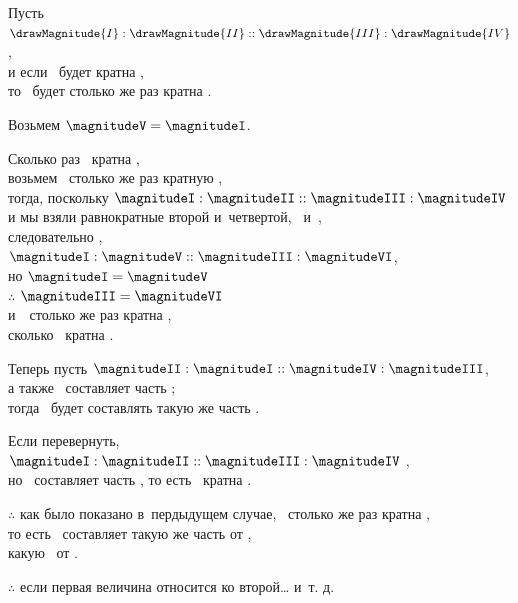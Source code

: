 \documentclass[letters,booklanguage=russian]{byrnebook}
\begin{document}
\begin{center}
Пусть $\drawMagnitude{I} : \drawMagnitude{II} :: \drawMagnitude{III} : \drawMagnitude{IV}$,\\
и если \magnitudeI\ будет кратна \magnitudeII,\\
то \magnitudeIII\ будет столько же раз кратна \magnitudeIV.

Возьмем  $\magnitudeV = \magnitudeI$.

Сколько раз \magnitudeI\ кратна \magnitudeII,\\
возьмем \magnitudeVI\ столько же раз кратную \magnitudeIV, \\
тогда, поскольку $\magnitudeI : \magnitudeII :: \magnitudeIII : \magnitudeIV$\\
и мы взяли равнократные второй и~четвертой, \magnitudeI\ и~\magnitudeVI,\\
следовательно ,\\
$\magnitudeI : \magnitudeV :: \magnitudeIII : \magnitudeVI$,\\
 но \byref{\constref} $\magnitudeI = \magnitudeV$\\
 $\therefore$  $\magnitudeIII = \magnitudeVI$\\
 и~\magnitudeVI\ столько же раз кратна \magnitudeIV,\\
 сколько \magnitudeI\ кратна \magnitudeII.

Теперь пусть $\magnitudeII : \magnitudeI :: \magnitudeIV : \magnitudeIII$,\\
а также \magnitudeII\ составляет часть \magnitudeI;\\
тогда \magnitudeIV\ будет составлять такую же часть \magnitudeIII.

Если перевернуть, $\magnitudeI : \magnitudeII :: \magnitudeIII : \magnitudeIV$ ,\\
но \magnitudeII\ составляет часть \magnitudeI,
то есть \magnitudeI\ кратна \magnitudeII.

$\therefore$ как было показано в~пердыдущем случае, \magnitudeIII\ столько же раз кратна \magnitudeIV,\\
то есть \magnitudeIV\ составляет такую же часть от \magnitudeIII,\\
какую \magnitudeII\ от \magnitudeI.

$\therefore$ если первая величина относится ко второй… и~т. д.
\end{center}

\vfill\pagebreak

\label{prop:V.VII}
\end{document}
